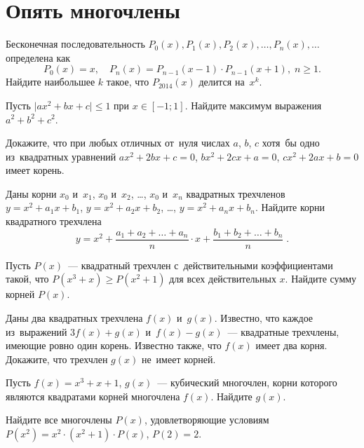 
\section*{Опять многочлены}


\begin{problems}

\item
Бесконечная последовательность
$P_0(x), P_1(x), P_2(x), \ldots, P_n(x), \ldots$
определена как
\[
    P_0(x) = x
,\quad
    P_n(x) = P_{n-1}(x - 1) \cdot P_{n-1}(x + 1)
,\;
    n \geq 1
.\]
Найдите наибольшее $k$ такое, что $P_{2014}(x)$ делится на~$x^k$.

\item
Пусть $\lvert a x^2 + b x + c \rvert \leq 1$ при $x \in [-1; 1]$.
Найдите максимум выражения $a^2 + b^2 + c^2$.

\item
Докажите, что при любых отличных от~нуля числах $a$, $b$, $c$ хотя~бы одно
из~квадратных уравнений
$a x^2 + 2 b x + c = 0$, $b x^2 + 2 c x + a = 0$, $c x^2 + 2 a x + b = 0$
имеет корень.

\item
Даны корни $x_0$ и~$x_1$, $x_0$ и~$x_2$, \ldots, $x_0$ и~$x_n$ квадратных
трехчленов
$y = x^2 + a_1 x + b_1$, $y = x^2 + a_2 x + b_2$, \ldots,
$y = x^2 + a_n x + b_n$.
Найдите корни квадратного трехчлена
\[
    y
=
    x^2
    +
    \frac{a_1 + a_2 + \ldots + a_n}{n} \cdot x
    +
    \frac{b_1 + b_2 + \ldots + b_n}{n}
\; . \]

\item
Пусть $P(x)$~— квадратный трехчлен с~действительными коэффициентами такой,
что $P(x^3 + x) \geq P(x^2 + 1)$ для всех действительных $x$.
Найдите сумму корней $P(x)$.

\item
Даны два квадратных трехчлена $f(x)$ и~$g(x)$.
Известно, что каждое из~выражений $3 f(x) + g(x)$ и~$f(x) - g(x)$~—
квадратные трехчлены, имеющие ровно один корень.
Известно также, что $f(x)$ имеет два корня.
Докажите, что трехчлен $g(x)$ не~имеет корней.

\item
Пусть $f(x) = x^3 + x + 1$, $g(x)$~— кубический многочлен, корни которого
являются квадратами корней многочлена $f(x)$.
Найдите $g(x)$.

\item
Найдите все многочлены $P(x)$, удовлетворяющие условиям
$P(x^2) = x^2 \cdot (x^2 + 1) \cdot P(x)$, $P(2) = 2$.

\end{problems}

